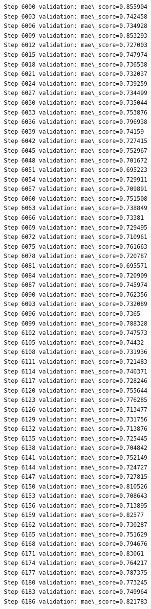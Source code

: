 \documentclass[11pt]{article}
\begin{document}
\begin{Verbatim}[commandchars=\\\{\}]
Step 6000 validation: mae\_score=0.855904
Step 6003 validation: mae\_score=0.742458
Step 6006 validation: mae\_score=0.734928
Step 6009 validation: mae\_score=0.853293
Step 6012 validation: mae\_score=0.727003
Step 6015 validation: mae\_score=0.747974
Step 6018 validation: mae\_score=0.736538
Step 6021 validation: mae\_score=0.732037
Step 6024 validation: mae\_score=0.739259
Step 6027 validation: mae\_score=0.734499
Step 6030 validation: mae\_score=0.735044
Step 6033 validation: mae\_score=0.753876
Step 6036 validation: mae\_score=0.796938
Step 6039 validation: mae\_score=0.74159
Step 6042 validation: mae\_score=0.727415
Step 6045 validation: mae\_score=0.752967
Step 6048 validation: mae\_score=0.701672
Step 6051 validation: mae\_score=0.695223
Step 6054 validation: mae\_score=0.729911
Step 6057 validation: mae\_score=0.709891
Step 6060 validation: mae\_score=0.751508
Step 6063 validation: mae\_score=0.738849
Step 6066 validation: mae\_score=0.73381
Step 6069 validation: mae\_score=0.729495
Step 6072 validation: mae\_score=0.710961
Step 6075 validation: mae\_score=0.761663
Step 6078 validation: mae\_score=0.720787
Step 6081 validation: mae\_score=0.695571
Step 6084 validation: mae\_score=0.720909
Step 6087 validation: mae\_score=0.745974
Step 6090 validation: mae\_score=0.762356
Step 6093 validation: mae\_score=0.732089
Step 6096 validation: mae\_score=0.7365
Step 6099 validation: mae\_score=0.788328
Step 6102 validation: mae\_score=0.747573
Step 6105 validation: mae\_score=0.74432
Step 6108 validation: mae\_score=0.731936
Step 6111 validation: mae\_score=0.721483
Step 6114 validation: mae\_score=0.740371
Step 6117 validation: mae\_score=0.728246
Step 6120 validation: mae\_score=0.755644
Step 6123 validation: mae\_score=0.776285
Step 6126 validation: mae\_score=0.713477
Step 6129 validation: mae\_score=0.731756
Step 6132 validation: mae\_score=0.713876
Step 6135 validation: mae\_score=0.725445
Step 6138 validation: mae\_score=0.704842
Step 6141 validation: mae\_score=0.752149
Step 6144 validation: mae\_score=0.724727
Step 6147 validation: mae\_score=0.727815
Step 6150 validation: mae\_score=0.810526
Step 6153 validation: mae\_score=0.708643
Step 6156 validation: mae\_score=0.713895
Step 6159 validation: mae\_score=0.82577
Step 6162 validation: mae\_score=0.730287
Step 6165 validation: mae\_score=0.751629
Step 6168 validation: mae\_score=0.794676
Step 6171 validation: mae\_score=0.83061
Step 6174 validation: mae\_score=0.764217
Step 6177 validation: mae\_score=0.787375
Step 6180 validation: mae\_score=0.773245
Step 6183 validation: mae\_score=0.749964
Step 6186 validation: mae\_score=0.821783

\end{Verbatim}
\end{document}
